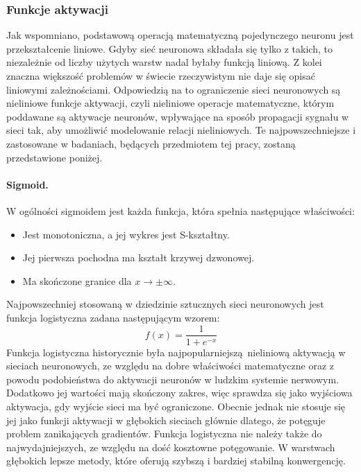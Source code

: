 \subsubsection{Funkcje aktywacji}
Jak wspomniano, podstawową operacją matematyczną pojedynczego neuronu jest przekształcenie liniowe. Gdyby sieć neuronowa składała się tylko z takich, to niezależnie od liczby użytych warstw nadal byłaby funkcją liniową. Z kolei znaczna większość problemów w świecie rzeczywistym nie daje się opisać liniowymi zależnościami\cite{enwiki:1308010043}. Odpowiedzią na to ograniczenie sieci neuronowych są nieliniowe funkcje aktywacji, czyli nieliniowe operacje matematyczne, którym poddawane są aktywacje neuronów, wpływające na sposób propagacji sygnału w sieci tak, aby umożliwić modelowanie relacji nieliniowych. Te najpowszechniejsze i zastosowane w badaniach, będących przedmiotem tej pracy, zostaną przedstawione poniżej.
\paragraph{Sigmoid.}
W ogólności sigmoidem jest każda funkcja, która spełnia następujące właściwości:
\begin{itemize}
	\item Jest monotoniczna, a jej wykres jest S-kształtny.
	\item Jej pierwsza pochodna ma kształt krzywej dzwonowej.
	\item Ma skończone granice dla \(x \rightarrow \pm \infty \).
\end{itemize}
Najpowszechniej stosowaną w dziedzinie sztucznych sieci neuronowych jest funkcja logistyczna zadana następującym wzorem:
\[ f(x) = \frac{1}{1 + e^{-x}} \]
Funkcja logistyczna historycznie była najpopularniejszą nieliniową aktywacją w sieciach neuronowych, ze względu na dobre właściwości matematyczne oraz z powodu podobieństwa do aktywacji neuronów w ludzkim systemie nerwowym. Dodatkowo jej wartości mają skończony zakres, więc sprawdza się jako wyjściowa aktywacja, gdy wyjście sieci ma być ograniczone. Obecnie jednak nie stosuje się jej jako funkcji aktywacji w głębokich sieciach głównie dlatego, że potęguje problem zanikających gradientów. Funkcja logistyczna nie należy także do najwydajniejszych, ze względu na dość kosztowne potęgowanie. W warstwach głębokich lepsze metody, które oferują szybszą i bardziej stabilną konwergencję.
